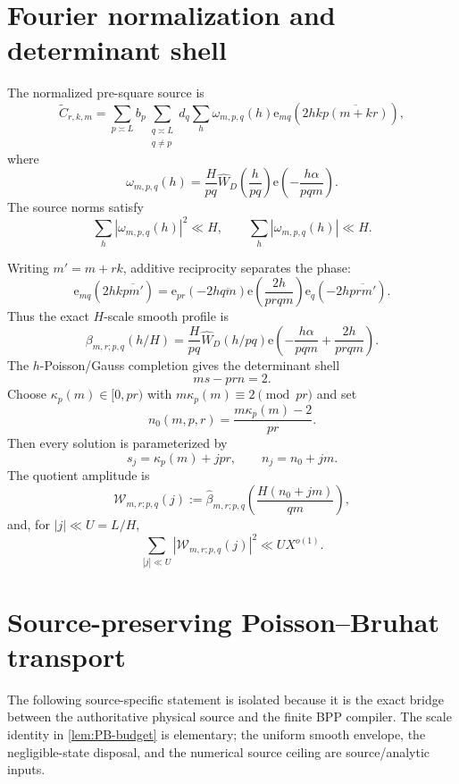 \documentclass[11pt]{article}
\theoremstyle{definition}
\newcommand{\e}{\mathrm e}
\newcommand{\1}{\mathbf 1}
\begin{document}
\section{Fourier normalization and determinant shell}
The normalized pre-square source is
\begin{equation}
 \widetilde C_{r,k,m}
   =\sum_{p\asymp L}b_p
    \sum_{\substack{q\asymp L\\q\ne p}}d_q
    \sum_h\omega_{m,p,q}(h)
    \e_{mq}\!\left(2hk\overline{p(m+kr)}\right),
 \label{eq:Ctilde}
\end{equation}
where
\begin{equation}
   \omega_{m,p,q}(h)
   =\frac{H}{pq}\widehat W_D\!\left(\frac{h}{pq}\right)
    \e\!\left(-\frac{h\alpha}{pqm}\right).
   \label{eq:omega}
\end{equation}
The source norms satisfy
\[
   \sum_h|\omega_{m,p,q}(h)|^2\ll H,\qquad
   \sum_h|\omega_{m,p,q}(h)|\ll H.
\]

Writing $m'=m+rk$, additive reciprocity separates the phase:
\begin{equation}
 \e_{mq}\!\left(2hk\overline{pm'}\right)
 =
 \e_{pr}\!\left(-2h\overline{qm}\right)
 \e\!\left(\frac{2h}{prqm}\right)
 \e_q\!\left(-2h\overline{prm'}\right).
 \label{eq:addrec}
\end{equation}
Thus the exact $H$-scale smooth profile is
\[
 \beta_{m,r;p,q}(h/H)
 =\frac{H}{pq}\widehat W_D(h/pq)
  \e\!\left(-\frac{h\alpha}{pqm}+\frac{2h}{prqm}\right).
\]
The $h$-Poisson/Gauss completion gives the determinant shell
\begin{equation}
    ms-prn=2.
    \label{eq:shell}
\end{equation}
Choose $\kappa_p(m)\in[0,pr)$ with $m\kappa_p(m)\equiv2\pmod{pr}$ and set
\[
    n_0(m,p,r)=\frac{m\kappa_p(m)-2}{pr}.
\]
Then every solution is parameterized by
\[
    s_j=\kappa_p(m)+jpr,\qquad n_j=n_0+jm.
\]
The quotient amplitude is
\begin{equation}
   \mathcal W_{m,r;p,q}(j)
   :=\widehat\beta_{m,r;p,q}
      \!\left(\frac{H(n_0+jm)}{qm}\right),
   \label{eq:Wsrc}
\end{equation}
and, for $|j|\ll U=L/H$,
\begin{equation}
   \sum_{|j|\ll U}|\mathcal W_{m,r;p,q}(j)|^2\ll U X^{o(1)}.
   \label{eq:Wsrcnorm}
\end{equation}

\section{Source-preserving Poisson--Bruhat transport}
\label{sec:PB}
The following source-specific statement is isolated because it is the exact
bridge between the authoritative physical source and the finite BPP compiler.
The scale identity in \cref{lem:PB-budget} is elementary; the uniform smooth
envelope, the negligible-state disposal, and the numerical source ceiling are
source/analytic inputs.
\end{document}
